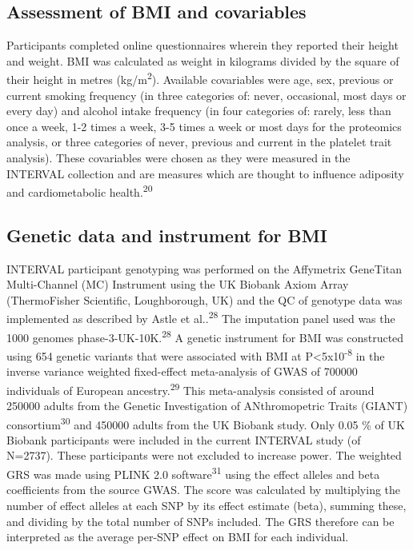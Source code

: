 \documentclass[11pt,twoside]{bristolthesis}
\begin{document}
\hypertarget{assessment-of-bmi-and-covariables}{%
\subsection{Assessment of BMI and covariables}\label{assessment-of-bmi-and-covariables}}

Participants completed online questionnaires wherein they reported their height and weight. BMI was calculated as weight in kilograms divided by the square of their height in metres (kg/m\textsuperscript{2}). Available covariables were age, sex, previous or current smoking frequency (in three categories of: never, occasional, most days or every day) and alcohol intake frequency (in four categories of: rarely, less than once a week, 1-2 times a week, 3-5 times a week or most days for the proteomics analysis, or three categories of never, previous and current in the platelet trait analysis). These covariables were chosen as they were measured in the INTERVAL collection and are measures which are thought to influence adiposity and cardiometabolic health.\textsuperscript{20}

\hypertarget{genetic-data-and-instrument-for-bmi}{%
\subsection{Genetic data and instrument for BMI}\label{genetic-data-and-instrument-for-bmi}}

INTERVAL participant genotyping was performed on the Affymetrix GeneTitan Multi-Channel (MC) Instrument using the UK Biobank Axiom Array (ThermoFisher Scientific, Loughborough, UK) and the QC of genotype data was implemented as described by Astle et al..\textsuperscript{28} The imputation panel used was the 1000 genomes phase-3-UK-10K.\textsuperscript{28} A genetic instrument for BMI was constructed using 654 genetic variants that were associated with BMI at P\textless5x10\textsuperscript{-8} in the inverse variance weighted fixed-effect meta-analysis of GWAS of 700000 individuals of European ancestry.\textsuperscript{29} This meta-analysis consisted of around 250000 adults from the Genetic Investigation of ANthromopetric Traits (GIANT) consortium\textsuperscript{30} and 450000 adults from the UK Biobank study. Only 0.05 \% of UK Biobank participants were included in the current INTERVAL study (of N=2737). These participants were not excluded to increase power. The weighted GRS was made using PLINK 2.0 software\textsuperscript{31} using the effect alleles and beta coefficients from the source GWAS. The score was calculated by multiplying the number of effect alleles at each SNP by its effect estimate (beta), summing these, and dividing by the total number of SNPs included. The GRS therefore can be interpreted as the average per-SNP effect on BMI for each individual.
\end{document}
